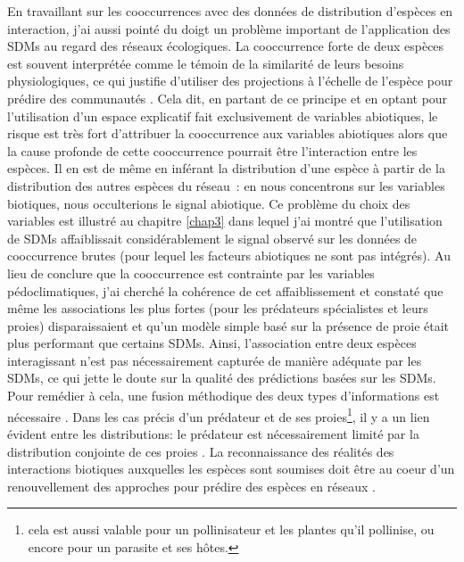 En travaillant sur les cooccurrences avec des données de distribution
d'espèces en interaction, j'ai aussi pointé du doigt un problème
important de l'application des SDMs au regard des réseaux écologiques.
La cooccurrence forte de deux espèces est souvent interprétée comme le
témoin de la similarité de leurs besoins physiologiques, ce qui justifie
d'utiliser des projections à l'échelle de l'espèce pour prédire des
communautés \citep{Rehfeldt2006, Albouy2012}. Cela dit, en partant de ce
principe et en optant pour l'utilisation d'un espace explicatif fait
exclusivement de variables abiotiques, le risque est très fort
d'attribuer la cooccurrence aux variables abiotiques alors que la cause
profonde de cette cooccurrence pourrait être l'interaction entre les
espèces. Il en est de même en inférant la distribution d'une espèce à
partir de la distribution des autres espèces du réseau~: en nous
concentrons sur les variables biotiques, nous occulterions le signal
abiotique. Ce problème du choix des variables est illustré au chapitre
\ref{chap3} dans lequel j'ai montré que l'utilisation de SDMs
affaiblissait considérablement le signal observé sur les données de
cooccurrence brutes (pour lequel les facteurs abiotiques ne sont pas
intégrés). Au lieu de conclure que la cooccurrence est contrainte par
les variables pédoclimatiques, j'ai cherché la cohérence de cet
affaiblissement et constaté que même les associations les plus fortes
(pour les prédateurs spécialistes et leurs proies) disparaissaient et
qu'un modèle simple basé sur la présence de proie était plus performant
que certains SDMs. Ainsi, l'association entre deux espèces interagissant
n'est pas nécessairement capturée de manière adéquate par les SDMs, ce
qui jette le doute sur la qualité des prédictions basées sur les SDMs.
Pour remédier à cela, une fusion méthodique des deux types
d'informations est nécessaire \citep{Meier2010, Thuiller2013}. Dans les
cas précis d'un prédateur et de ses proies\footnote{cela est aussi
  valable pour un pollinisateur et les plantes qu'il pollinise, ou
  encore pour un parasite et ses hôtes.}, il y a un lien évident entre
les distributions: le prédateur est nécessairement limité par la
distribution conjointe de ces proies \citep{Holt2009, Shenbrot2007}. La
reconnaissance des réalités des interactions biotiques auxquelles les
espèces sont soumises doit être au coeur d'un renouvellement des
approches pour prédire des espèces en réseaux \citep{Godsoe2015}.

